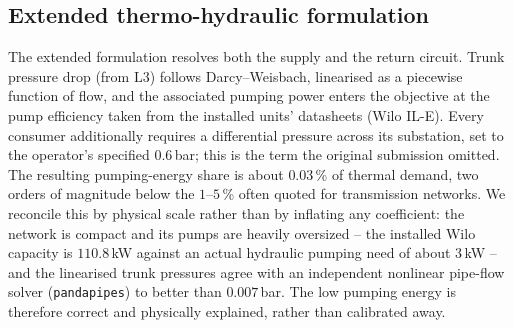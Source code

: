 \documentclass[a4paper,fleqn]{cas-dc}
\newcommand{\Lthree}{\ensuremath{\mathrm{L3}}}  %
\begin{document}



\subsection{Extended thermo-hydraulic formulation}\label{sec:extended}

The extended formulation resolves both the supply and the return circuit. Trunk pressure drop
(from $\Lthree$) follows Darcy--Weisbach, linearised as a piecewise function of flow, and the
associated pumping power enters the objective at the pump efficiency taken from the installed
units' datasheets (Wilo IL-E). Every consumer additionally requires a differential pressure
across its substation, set to the operator's specified $0.6$\,bar; this is the term the
original submission omitted. The resulting pumping-energy share
is about $0.03$\,\% of thermal demand, two orders of magnitude below the $1$--$5$\,\% often
quoted for transmission networks. We reconcile this by physical scale rather than by inflating
any coefficient: the network is compact and its pumps are heavily oversized -- the installed
Wilo capacity is $110.8$\,kW against an actual hydraulic pumping need of about $3$\,kW -- and
the linearised trunk pressures agree with an independent nonlinear pipe-flow solver
(\texttt{pandapipes}) to better than $0.007$\,bar. The low pumping energy is therefore correct
and physically explained, rather than calibrated away.
\end{document}
